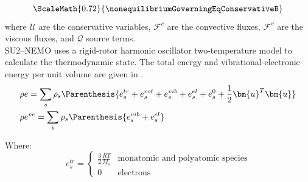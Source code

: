 \begin{equation}\label{eq:nonequilibriumGoverningEqConservativeB}
    \ScaleMath{0.72}{\nonequilibriumGoverningEqConservativeB}
\end{equation}
where $\mathcal{U}$ are the conservative variables, $\mathcal{F}^c$ are the
convective fluxes, $\mathcal{F}^{v}$ are the viscous fluxes, and $\mathcal{Q}$
source terms. \\

\Gls{SU2}--\Gls{NEMO} uses a rigid-rotor harmonic oscillator two-temperature
model to calculate the thermodynamic state. The total energy and
vibrational-electronic energy per unit volume are given in .
\begin{subequations}\label{eq:nemoEnergy}
    \begin{align}
        &\rho e = \sum_{s}\rho_s\Parenthesis{e_s^{tr} + e_{s}^{rot} + e_s^{vib} + e_s^{el}
        + e^0_s + \frac{1}{2}\bm{u}^T\bm{u}} \label{eq:nemoTotalEnergy} \\
        &\rho e^{ve} =\sum_s \rho_s \Parenthesis{e_s^{vib} + e_s^{el} }
        \label{eq:nemoVibrationalEnergy} 
    \end{align}
\end{subequations}

Where:
\begin{equation}\label{eq:nemoTranslationalSpeciesEnergy}
    e^{tr}_s = \begin{cases}
        \frac{3}{2}\frac{R T}{M_s} & \text{monatomic and polyatomic species} \\
        0 & \text{electrons}
    \end{cases}
\end{equation}

